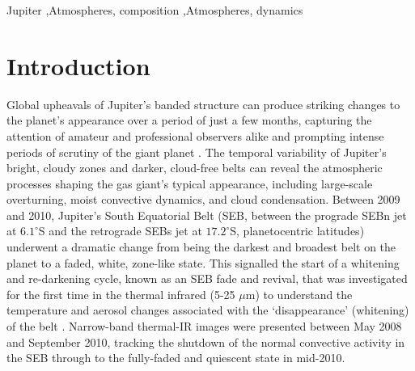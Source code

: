 \documentclass[final,authoryear,5p,times,twocolumn]{elsarticle}
\begin{document}
\begin{frontmatter}
\begin{abstract}
\end{abstract}

\begin{keyword}
Jupiter \sep Atmospheres, composition \sep Atmospheres, dynamics

\end{keyword}

\end{frontmatter}


\section{Introduction}
\label{intro}

Global upheavals of Jupiter's banded structure can produce striking changes to the planet's appearance over a period of just a few months, capturing the attention of amateur and professional observers alike and prompting intense periods of scrutiny of the giant planet \citep{95rogers}.  The temporal variability of Jupiter's bright, cloudy zones and darker, cloud-free belts can reveal the atmospheric processes shaping the gas giant's typical appearance, including large-scale overturning, moist convective dynamics, and cloud condensation.  Between 2009 and 2010, Jupiter's South Equatorial Belt (SEB, between the prograde SEBn jet at $6.1^\circ$S and the retrograde SEBs jet at $17.2^\circ$S, planetocentric latitudes) underwent a dramatic change from being the darkest and broadest belt on the planet to a faded, white, zone-like state.  This signalled the start of a whitening and re-darkening cycle, known as an SEB fade and revival, that was investigated for the first time in the thermal infrared (5-25 $\mu$m) to understand the temperature and aerosol changes associated with the `disappearance' (whitening) of the belt \citep[][hereafter Paper 1]{11fletcher_fade}.  Narrow-band thermal-IR images were presented between May 2008 and September 2010, tracking the shutdown of the normal convective activity in the SEB through to the fully-faded and quiescent state in mid-2010.  
\end{document}
